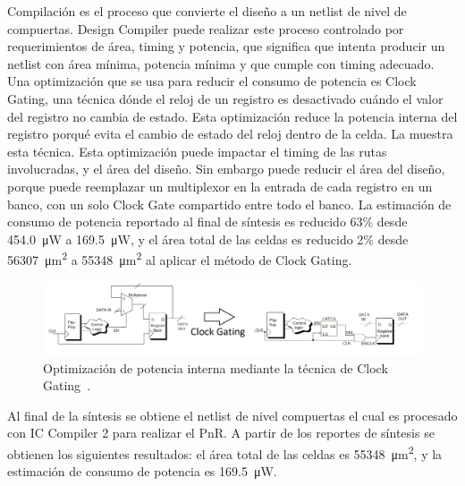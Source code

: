 \documentclass[a4paper, twoside, 11pt]{report}
\begin{document}
Compilación es el proceso que convierte el diseño a un netlist de nivel de compuertas. Design Compiler puede realizar este proceso controlado por requerimientos de área, timing y potencia, que significa que intenta producir un netlist con área mínima, potencia mínima y que cumple con timing adecuado. Una optimización que se usa para reducir el consumo de potencia es Clock Gating, una técnica dónde el reloj de un registro es desactivado cuándo el valor del registro no cambia de estado. Esta optimización reduce la potencia interna del registro porqué evita el cambio de estado del reloj dentro de la celda. La  muestra esta técnica. Esta optimización puede impactar el timing de las rutas involucradas, y el área del diseño. Sin embargo puede reducir el área del diseño, porque puede reemplazar un multiplexor en la entrada de cada registro en un banco, con un solo Clock Gate compartido entre todo el banco. La estimación de consumo de potencia reportado al final de síntesis es reducido 63\% desde \SI{454.0}{\micro\watt} a \SI{169.5}{\micro\watt}, y el área total de las celdas es reducido 2\% desde \SI{56307}{\micro\meter\squared} a \SI{55348}{\micro\meter\squared} al aplicar el método de Clock Gating.

\begin{figure}[htb]
  \centering
  \includegraphics[width=1.0\textwidth]{./img/clock_gating}
  \caption{Optimización de potencia interna mediante la técnica de Clock Gating~\cite[Adaptado de][]{power_compiler_ug}.}
  \label{fig:clock_gating}
\end{figure}

Al final de la síntesis se obtiene el netlist de nivel compuertas el cual es procesado con IC Compiler 2 para realizar el PnR. A partir de los reportes de síntesis se obtienen los siguientes resultados: el área total de las celdas es \SI{55348}{\micro\meter\squared}, y la estimación de consumo de potencia es \SI{169.5}{\micro\watt}.
\end{document}

